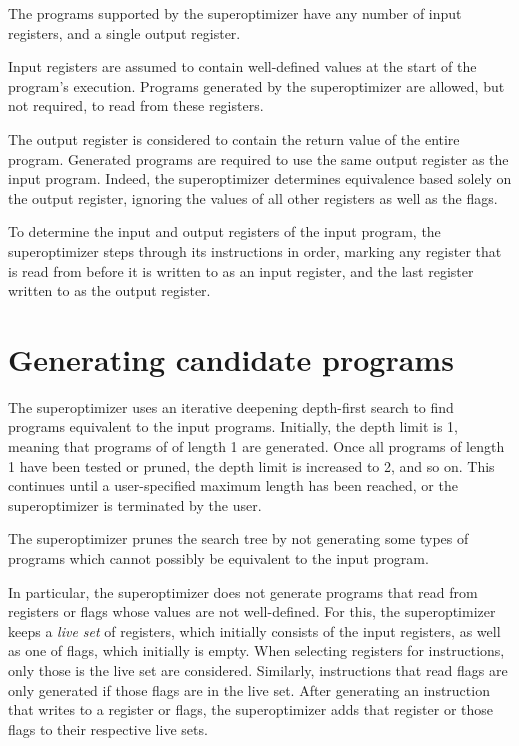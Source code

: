 \documentclass[a4paper,11pt]{kth-mag}
\begin{document}

The programs supported by the superoptimizer have any number of input registers, and a single output register.

Input registers are assumed to contain well-defined values at the start of the program's execution.
Programs generated by the superoptimizer are allowed, but not required, to read from these registers.

The output register is considered to contain the return value of the entire program.
Generated programs are required to use the same output register as the input program.
Indeed, the superoptimizer determines equivalence based solely on the output register, ignoring the values of all other registers as well as the flags.

To determine the input and output registers of the input program, the superoptimizer steps through its instructions in order, marking any register that is read from before it is written to as an input register, and the last register written to as the output register.

\section{Generating candidate programs}

The superoptimizer uses an iterative deepening depth-first search to find programs equivalent to the input programs.
Initially, the depth limit is 1, meaning that programs of of length 1 are generated.
Once all programs of length 1 have been tested or pruned, the depth limit is increased to 2, and so on.
This continues until a user-specified maximum length has been reached, or the superoptimizer is terminated by the user.


The superoptimizer prunes the search tree by not generating some types of programs which cannot possibly be equivalent to the input program.

In particular, the superoptimizer does not generate programs that read from registers or flags whose values are not well-defined. %
For this, the superoptimizer keeps a \emph{live set} of registers, which initially consists of the input registers, as well as one of flags, which initially is empty.
When selecting registers for instructions, only those is the live set are considered.
Similarly, instructions that read flags are only generated if those flags are in the live set.
After generating an instruction that writes to a register or flags, the superoptimizer adds that register or those flags to their respective live sets.
\end{document}
